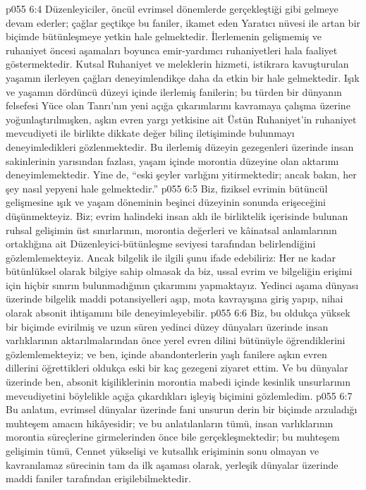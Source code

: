 \vs p055 6:4 Düzenleyiciler, öncül evrimsel dönemlerde gerçekleştiği gibi gelmeye devam ederler; çağlar geçtikçe bu faniler, ikamet eden Yaratıcı nüvesi ile artan bir biçimde bütünleşmeye yetkin hale gelmektedir. İlerlemenin gelişmemiş ve ruhaniyet öncesi aşamaları boyunca emir\hyp{}yardımcı ruhaniyetleri hala faaliyet göstermektedir. Kutsal Ruhaniyet ve meleklerin hizmeti, istikrara kavuşturulan yaşamın ilerleyen çağları deneyimlendikçe daha da etkin bir hale gelmektedir. Işık ve yaşamın dördüncü düzeyi içinde ilerlemiş fanilerin; bu türden bir dünyanın felsefesi Yüce olan Tanrı’nın yeni açığa çıkarımlarını kavramaya çalışma üzerine yoğunlaştırılmışken, aşkın evren yargı yetkisine ait Üstün Ruhaniyet’in ruhaniyet mevcudiyeti ile birlikte dikkate değer bilinç iletişiminde bulunmayı deneyimledikleri gözlenmektedir. Bu ilerlemiş düzeyin gezegenleri üzerinde insan sakinlerinin yarısından fazlası, yaşam içinde morontia düzeyine olan aktarımı deneyimlemektedir. Yine de, “eski şeyler varlığını yitirmektedir; ancak bakın, her şey nasıl yepyeni hale gelmektedir.”
\vs p055 6:5 Biz, fiziksel evrimin bütüncül gelişmesine ışık ve yaşam döneminin beşinci düzeyinin sonunda erişeceğini düşünmekteyiz. Biz; evrim halindeki insan aklı ile birliktelik içerisinde bulunan ruhsal gelişimin üst sınırlarının, morontia değerleri ve kâinatsal anlamlarının ortaklığına ait Düzenleyici\hyp{}bütünleşme seviyesi tarafından belirlendiğini gözlemlemekteyiz. Ancak bilgelik ile ilgili şunu ifade edebiliriz: Her ne kadar bütünlüksel olarak bilgiye sahip olmasak da biz, ussal evrim ve bilgeliğin erişimi için hiçbir sınırın bulunmadığının çıkarımını yapmaktayız. Yedinci aşama dünyası üzerinde bilgelik maddi potansiyelleri aşıp, mota kavrayışına giriş yapıp, nihai olarak absonit ihtişamını bile deneyimleyebilir.
\vs p055 6:6 Biz, bu oldukça yüksek bir biçimde evirilmiş ve uzun süren yedinci düzey dünyaları üzerinde insan varlıklarının aktarılmalarından önce yerel evren dilini bütünüyle öğrendiklerini gözlemlemekteyiz; ve ben, içinde abandonterlerin yaşlı fanilere aşkın evren dillerini öğrettikleri oldukça eski bir kaç gezegeni ziyaret ettim. Ve bu dünyalar üzerinde ben, absonit kişiliklerinin morontia mabedi içinde kesinlik unsurlarının mevcudiyetini böylelikle açığa çıkardıkları işleyiş biçimini gözlemledim.
\vs p055 6:7 Bu anlatım, evrimsel dünyalar üzerinde fani unsurun derin bir biçimde arzuladığı muhteşem amacın hikâyesidir; ve bu anlatılanların tümü, insan varlıklarının morontia süreçlerine girmelerinden önce bile gerçekleşmektedir; bu muhteşem gelişimin tümü, Cennet yükselişi ve kutsallık erişiminin sonu olmayan ve kavranılamaz sürecinin tam da ilk aşaması olarak, yerleşik dünyalar üzerinde maddi faniler tarafından erişilebilmektedir.
